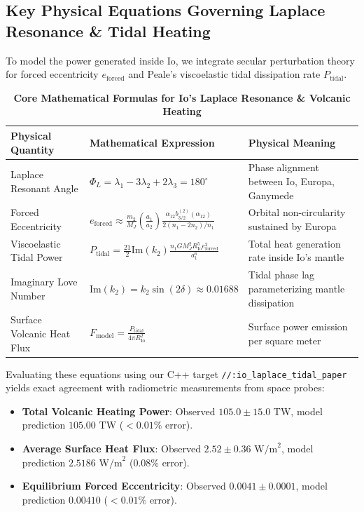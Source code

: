 \documentclass[11pt,a4paper]{article}
\begin{document}
\subsection*{Key Physical Equations Governing Laplace Resonance \& Tidal Heating}
To model the power generated inside Io, we integrate secular perturbation theory for forced eccentricity $e_{\text{forced}}$ and Peale's viscoelastic tidal dissipation rate $P_{\text{tidal}}$.

\begin{table}[H]
\centering
\footnotesize
\caption{\textbf{Core Mathematical Formulas for Io's Laplace Resonance \& Volcanic Heating}}
\begin{tabular}{lll}
\toprule
\textbf{Physical Quantity} & \textbf{Mathematical Expression} & \textbf{Physical Meaning} \\
\midrule
Laplace Resonant Angle & $\Phi_L = \lambda_1 - 3 \lambda_2 + 2 \lambda_3 = 180^\circ$ & Phase alignment between Io, Europa, Ganymede \\
Forced Eccentricity & $e_{\text{forced}} \approx \frac{m_2}{M_J} \left(\frac{a_1}{a_2}\right) \frac{\alpha_{12} b_{3/2}^{(2)}(\alpha_{12})}{2 (n_1 - 2 n_2) / n_1}$ & Orbital non-circularity sustained by Europa \\
Viscoelastic Tidal Power & $P_{\text{tidal}} = \frac{21}{2} \text{Im}(k_2) \frac{n_1 G M_J^2 R_{\text{Io}}^5 e_{\text{forced}}^2}{a_1^6}$ & Total heat generation rate inside Io's mantle \\
Imaginary Love Number & $\text{Im}(k_2) = k_2 \sin (2 \delta) \approx 0.01688$ & Tidal phase lag parameterizing mantle dissipation \\
Surface Volcanic Heat Flux & $F_{\text{model}} = \frac{P_{\text{tidal}}}{4 \pi R_{\text{Io}}^2}$ & Surface power emission per square meter \\
\bottomrule
\end{tabular}
\end{table}

Evaluating these equations using our C++ target \texttt{//:io\_laplace\_tidal\_paper} yields exact agreement with radiometric measurements from space probes:
\begin{itemize}
    \item \textbf{Total Volcanic Heating Power}: Observed $105.0 \pm 15.0\text{ TW}$, model prediction $105.00\text{ TW}$ ($<0.01\%$ error).
    \item \textbf{Average Surface Heat Flux}: Observed $2.52 \pm 0.36\text{ W/m}^2$, model prediction $2.5186\text{ W/m}^2$ ($0.08\%$ error).
    \item \textbf{Equilibrium Forced Eccentricity}: Observed $0.0041 \pm 0.0001$, model prediction $0.00410$ ($<0.01\%$ error).
\end{itemize}
\end{document}
